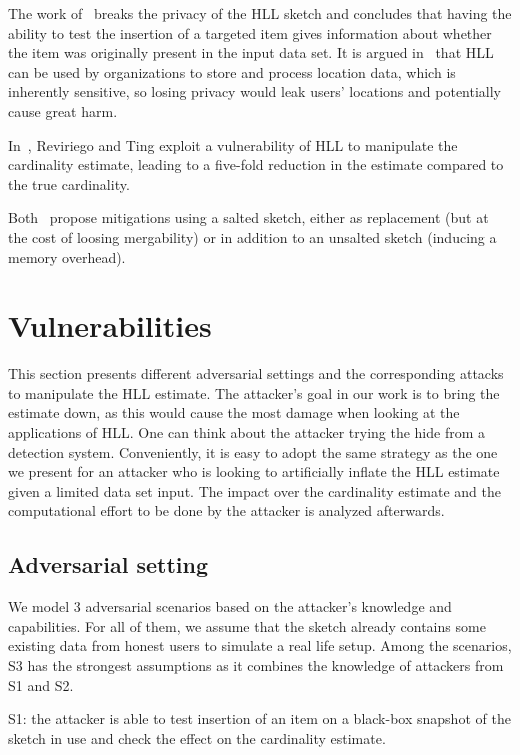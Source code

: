 \documentclass{IEEEtran}
\newcommand{\kenny}[2][inline]{\todo[#1]{\textbf{Kenny:} #2}\xspace}
\begin{document}
The work of~\cite{cardestprivacy} breaks the privacy of the HLL sketch and concludes that having the ability to test the insertion \kenny{what does this mean?} of a targeted item gives information about whether the item was originally present in the input data set. It is argued in~\cite{cardestprivacy} that HLL can be used by organizations to store and process location data, which is inherently sensitive, so losing privacy would leak users' locations and potentially cause great harm. 

In~\cite{hllvuln}, Reviriego and Ting exploit a vulnerability of HLL to manipulate the cardinality estimate, leading to a five-fold reduction in the estimate compared to the true cardinality.

Both~\cite{cardestprivacy,hllvuln} propose mitigations using a salted sketch, either as replacement (but at the cost of loosing mergability) or in addition to an unsalted sketch (inducing a memory overhead). 

\section{Vulnerabilities}\label{sec:attacks}
This section presents different adversarial settings and the corresponding attacks to manipulate the HLL estimate. The attacker's goal in our work is to bring the estimate down, as this would cause the most damage when looking at the applications of HLL. One can think about the attacker trying the hide from a detection system. Conveniently, it is easy to adopt the same strategy as the one we present for an attacker who is looking to artificially inflate the HLL estimate given a limited data set input. The impact over the cardinality estimate and the computational effort to be done by the attacker is analyzed afterwards. 

\subsection{Adversarial setting}
We model 3 adversarial scenarios based on the attacker's knowledge and capabilities. For all of them, we assume that the sketch already contains some existing data from honest users to simulate a real life setup. Among the scenarios, S3 has the strongest assumptions as it combines the knowledge of attackers from S1 and S2.

S1: the attacker is able to test insertion of an item on a black-box snapshot of the sketch in use and check the effect on the cardinality estimate.
\end{document}
